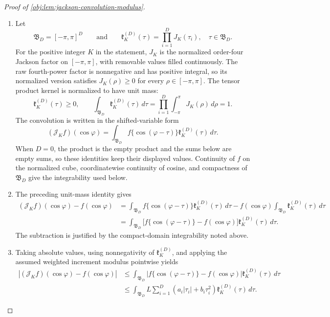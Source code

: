 \begin{proof}[Proof of \cref{obj:lem:jackson-convolution-modulus}]
\begin{enumerate}
\item Let
\[
\mathfrak B_D=[-\pi,\pi]^D
\qquad\text{and}\qquad
\mathfrak k_K^{(D)}(\tau)=\prod_{i=1}^D J_K(\tau_i),
\quad \tau\in\mathfrak B_D .
\]
For the positive integer \(K\) in the statement, \(J_K\) is the normalized order-four Jackson factor on \([-\pi,\pi]\), with removable values filled continuously. The raw fourth-power factor is nonnegative and has positive integral, so its normalized version satisfies \(J_K(\rho)\ge0\) for every \(\rho\in[-\pi,\pi]\). The tensor product kernel is normalized to have unit mass:
\[
\mathfrak k_K^{(D)}(\tau)\ge0,
\qquad
\int_{\mathfrak B_D}\mathfrak k_K^{(D)}(\tau)\,d\tau
=
\prod_{i=1}^D\int_{-\pi}^{\pi}J_K(\rho)\,d\rho
=1.
\]
The convolution is written in the shifted-variable form
\[
(\mathcal J_K f)(\cos\varphi)
=
\int_{\mathfrak B_D}
f\{\cos(\varphi-\tau)\}\mathfrak k_K^{(D)}(\tau)\,d\tau .
\]
When \(D=0\), the product is the empty product and the sums below are empty sums, so these identities keep their displayed values. Continuity of \(f\) on the normalized cube, coordinatewise continuity of cosine, and compactness of \(\mathfrak B_D\) give the integrability used below. %

\item The preceding unit-mass identity gives
\[
\begin{aligned}
(\mathcal J_K f)(\cos\varphi)-f(\cos\varphi)
&=
\int_{\mathfrak B_D}
f\{\cos(\varphi-\tau)\}\mathfrak k_K^{(D)}(\tau)\,d\tau
-
f(\cos\varphi)
\int_{\mathfrak B_D}\mathfrak k_K^{(D)}(\tau)\,d\tau  \\
&=
\int_{\mathfrak B_D}
\bigl[
f\{\cos(\varphi-\tau)\}-f(\cos\varphi)
\bigr]\mathfrak k_K^{(D)}(\tau)\,d\tau .
\end{aligned}
\]
The subtraction is justified by the compact-domain integrability noted above. %

\item Taking absolute values, using nonnegativity of \(\mathfrak k_K^{(D)}\), and applying the assumed weighted increment modulus pointwise yields
\[
\begin{aligned}
\left|(\mathcal J_K f)(\cos\varphi)-f(\cos\varphi)\right|
&\le
\int_{\mathfrak B_D}
\left|f\{\cos(\varphi-\tau)\}-f(\cos\varphi)\right|
\mathfrak k_K^{(D)}(\tau)\,d\tau  \\
&\le
\int_{\mathfrak B_D}
L\sum_{i=1}^D\left(a_i|\tau_i|+b_i\tau_i^2\right)
\mathfrak k_K^{(D)}(\tau)\,d\tau .
\end{aligned}
\] %


\end{enumerate}
\end{proof}
